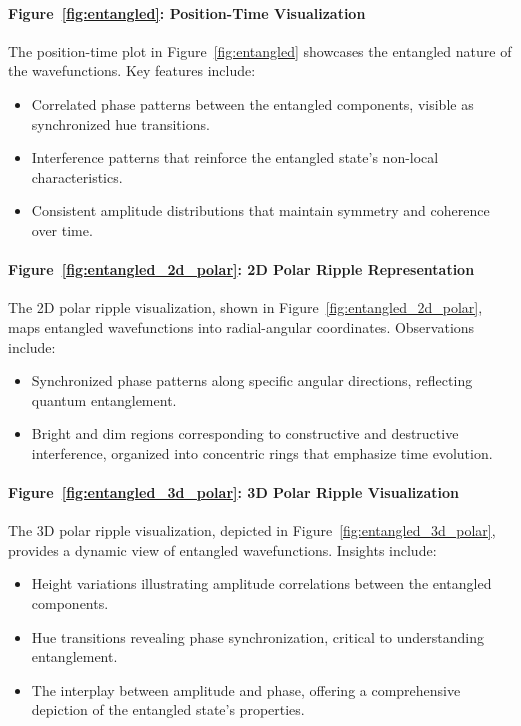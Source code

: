 \documentclass[12pt]{article}
\begin{document}
\paragraph{Figure~\ref{fig:entangled}: Position-Time Visualization}
The position-time plot in Figure~\ref{fig:entangled} showcases the entangled nature of the wavefunctions. Key features include:
\begin{itemize}
    \item Correlated phase patterns between the entangled components, visible as synchronized hue transitions.
    \item Interference patterns that reinforce the entangled state’s non-local characteristics.
    \item Consistent amplitude distributions that maintain symmetry and coherence over time.
\end{itemize}

\paragraph{Figure~\ref{fig:entangled_2d_polar}: 2D Polar Ripple Representation}
The 2D polar ripple visualization, shown in Figure~\ref{fig:entangled_2d_polar}, maps entangled wavefunctions into radial-angular coordinates. Observations include:
\begin{itemize}
    \item Synchronized phase patterns along specific angular directions, reflecting quantum entanglement.
    \item Bright and dim regions corresponding to constructive and destructive interference, organized into concentric rings that emphasize time evolution.
\end{itemize}

\paragraph{Figure~\ref{fig:entangled_3d_polar}: 3D Polar Ripple Visualization}
The 3D polar ripple visualization, depicted in Figure~\ref{fig:entangled_3d_polar}, provides a dynamic view of entangled wavefunctions. Insights include:
\begin{itemize}
    \item Height variations illustrating amplitude correlations between the entangled components.
    \item Hue transitions revealing phase synchronization, critical to understanding entanglement.
    \item The interplay between amplitude and phase, offering a comprehensive depiction of the entangled state’s properties.
\end{itemize}
\end{document}
